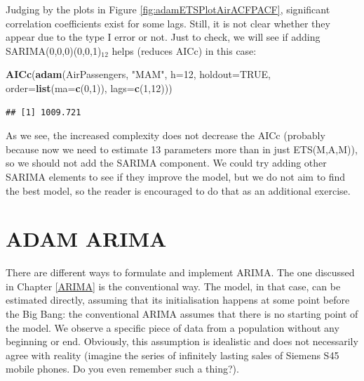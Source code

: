 \documentclass[]{book}
\newenvironment{Shaded}{\begin{snugshade}}{\end{snugshade}}
\newcommand{\DataTypeTok}[1]{\textcolor[rgb]{0.13,0.29,0.53}{#1}}
\newcommand{\DecValTok}[1]{\textcolor[rgb]{0.00,0.00,0.81}{#1}}
\newcommand{\KeywordTok}[1]{\textcolor[rgb]{0.13,0.29,0.53}{\textbf{#1}}}
\newcommand{\NormalTok}[1]{#1}
\newcommand{\OtherTok}[1]{\textcolor[rgb]{0.56,0.35,0.01}{#1}}
\newcommand{\StringTok}[1]{\textcolor[rgb]{0.31,0.60,0.02}{#1}}
\theoremstyle{definition}
\theoremstyle{definition}
\theoremstyle{definition}
\theoremstyle{definition}
\theoremstyle{remark}
\begin{document}
Judging by the plots in Figure \ref{fig:adamETSPlotAirACFPACF}, significant correlation coefficients exist for some lags. Still, it is not clear whether they appear due to the type I error or not. Just to check, we will see if adding SARIMA(0,0,0)(0,0,1)\(_{12}\) helps (reduces AICc) in this case:

\begin{Shaded}
\begin{Highlighting}[]
\KeywordTok{AICc}\NormalTok{(}\KeywordTok{adam}\NormalTok{(AirPassengers, }\StringTok{"MAM"}\NormalTok{, }\DataTypeTok{h=}\DecValTok{12}\NormalTok{, }\DataTypeTok{holdout=}\OtherTok{TRUE}\NormalTok{,}
          \DataTypeTok{order=}\KeywordTok{list}\NormalTok{(}\DataTypeTok{ma=}\KeywordTok{c}\NormalTok{(}\DecValTok{0}\NormalTok{,}\DecValTok{1}\NormalTok{)), }\DataTypeTok{lags=}\KeywordTok{c}\NormalTok{(}\DecValTok{1}\NormalTok{,}\DecValTok{12}\NormalTok{)))}
\end{Highlighting}
\end{Shaded}

\begin{verbatim}
## [1] 1009.721
\end{verbatim}

As we see, the increased complexity does not decrease the AICc (probably because now we need to estimate 13 parameters more than in just ETS(M,A,M)), so we should not add the SARIMA component. We could try adding other SARIMA elements to see if they improve the model, but we do not aim to find the best model, so the reader is encouraged to do that as an additional exercise.

\hypertarget{ADAMARIMA}{%
\chapter{ADAM ARIMA}\label{ADAMARIMA}}

There are different ways to formulate and implement ARIMA. The one discussed in Chapter \ref{ARIMA} is the conventional way. The model, in that case, can be estimated directly, assuming that its initialisation happens at some point before the Big Bang: the conventional ARIMA assumes that there is no starting point of the model. We observe a specific piece of data from a population without any beginning or end. Obviously, this assumption is idealistic and does not necessarily agree with reality (imagine the series of infinitely lasting sales of Siemens S45 mobile phones. Do you even remember such a thing?).
\end{document}
